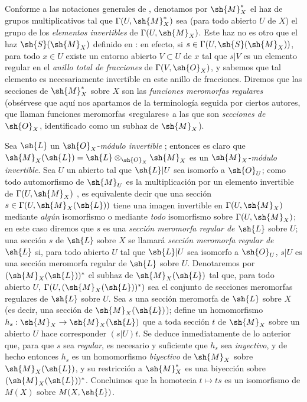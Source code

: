 \begin{env}[20.1.8]
\label{IV.20.1.8}
Conforme a las notaciones generales de , denotamos por $\sh{M}_X^*$ el haz de grupos multiplicativos tal que $\Gamma(U,\sh{M}_X^*)$ sea (para todo abierto $U$ de $X$) el grupo de los \emph{elementos invertibles} de $\Gamma(U,\sh{M}_X)$.
Este haz no es otro que el haz $\sh{S}(\sh{M}_X)$ definido en : en efecto, si $s\in\Gamma(U,\sh{S}(\sh{M}_X))$, para todo $x\in U$ existe un entorno abierto $V\subset U$ de $x$ tal que $s|V$ es un elemento regular en el \emph{anillo total de fracciones} de $\Gamma(V,\sh{O}_X)$, y sabemos que tal elemento es necesariamente invertible en este anillo de fracciones.
Diremos que las secciones de $\sh{M}_X^*$ sobre $X$ son las \emph{funciones meromorfas regulares} (obsérvese que aquí nos apartamos de la terminología seguida por ciertos autores, que llaman funciones meromorfas «regulares» a las que son \emph{secciones de $\sh{O}_X$}, identificado como un subhaz de $\sh{M}_X$).

Sea $\sh{L}$ un $\sh{O}_X$-\emph{módulo invertible} ; entonces es claro que $\sh{M}_X(\sh{L})=\sh{L}\otimes_{\sh{O}_X}\sh{M}_X$
es un $\sh{M}_X$-\emph{módulo invertible}.
Sea $U$ un abierto tal que $\sh{L}|U$ sea isomorfo a $\sh{O}_U$; como todo automorfismo de $\sh{M}_U$ es la multiplicación por un elemento invertible de $\Gamma(U,\sh{M}_X)$ , es equivalente decir que una sección $s\in\Gamma(U,\sh{M}_X(\sh{L}))$ tiene una imagen invertible en $\Gamma(U,\sh{M}_X)$ mediante \emph{algún} isomorfismo o mediante \emph{todo} isomorfismo sobre $\Gamma(U,\sh{M}_X)$; en este caso diremos que $s$ es una \emph{sección meromorfa regular de $\sh{L}$} sobre $U$; una sección $s$ de $\sh{L}$ sobre $X$ se llamará \emph{sección meromorfa regular de $\sh{L}$} si, para todo abierto $U$ tal que $\sh{L}|U$ sea isomorfo a $\sh{O}_U$, $s|U$ es una sección meromorfa regular de $\sh{L}$ sobre $U$.
Denotaremos por $(\sh{M}_X(\sh{L}))^*$ el subhaz de $\sh{M}_X(\sh{L})$ tal que, para todo abierto $U$, $\Gamma(U,(\sh{M}_X(\sh{L}))^*)$ sea el conjunto de secciones meromorfas regulares de $\sh{L}$ sobre $U$.
Sea $s$ una sección meromorfa de $\sh{L}$ sobre $X$ (es decir, una sección de $\sh{M}_X(\sh{L})$); define un homomorfismo $h_s:\sh{M}_X\to\sh{M}_X(\sh{L})$ que a toda sección $t$ de $\sh{M}_X$ sobre un abierto $U$ hace corresponder $(s|U)t$.
Se deduce inmediatamente de lo anterior que, para que $s$ sea \emph{regular}, es necesario y suficiente que $h_s$ sea \emph{inyectivo}, y de hecho entonces $h_s$ es un homomorfismo \emph{biyectivo} de $\sh{M}_X$ sobre $\sh{M}_X(\sh{L})$, y su restricción a $\sh{M}_X^*$ es una biyección sobre $(\sh{M}_X(\sh{L}))^*$.
Concluimos que la homotecia $t\mapsto ts$ es un isomorfismo de $M(X)$ sobre $M(X,\sh{L})$.
\end{env}

